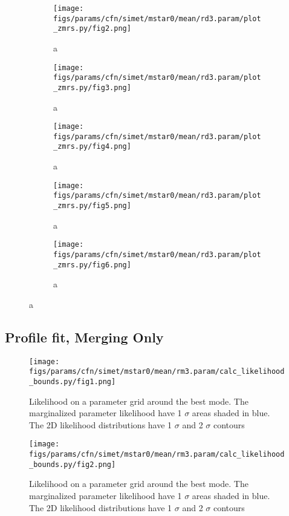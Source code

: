 \documentclass[twocolumn]{article}
\begin{document}
\begin{figure}
  \begin{subfigure}{.5\textwidth}
    \centering\texttt{[image: figs/params/cfn/simet/mstar0/mean/rd3.param/plot\_zmrs.py/fig2.png]}
    \caption{a}
  \end{subfigure}
  \begin{subfigure}{.5\textwidth}
    \centering\texttt{[image: figs/params/cfn/simet/mstar0/mean/rd3.param/plot\_zmrs.py/fig3.png]}
    \caption{a}
  \end{subfigure}
  \begin{subfigure}{.5\textwidth}
    \centering\texttt{[image: figs/params/cfn/simet/mstar0/mean/rd3.param/plot\_zmrs.py/fig4.png]}
    \caption{a}
  \end{subfigure}%
  \begin{subfigure}{.5\textwidth}
    \centering\texttt{[image: figs/params/cfn/simet/mstar0/mean/rd3.param/plot\_zmrs.py/fig5.png]}
    \caption{a}
  \end{subfigure}
  \begin{subfigure}{.5\textwidth}
    \centering\texttt{[image: figs/params/cfn/simet/mstar0/mean/rd3.param/plot\_zmrs.py/fig6.png]}
    \caption{a}
  \end{subfigure}
  
\end{figure}
\clearpage


\subsection{Profile fit, Merging Only}
\begin{figure}[H]
  \center\texttt{[image: figs/params/cfn/simet/mstar0/mean/rm3.param/calc\_likelihood\_bounds.py/fig1.png]}
  \caption{Likelihood on a parameter grid around the best mode. The marginalized parameter likelihood have
    1 $\sigma$ areas shaded in blue. The 2D likelihood distributions have 1 $\sigma$  and 2 $\sigma$ contours}
  \label{fig:basic_rd:likelihood}
\end{figure}

\begin{figure}[H]
  \center\texttt{[image: figs/params/cfn/simet/mstar0/mean/rm3.param/calc\_likelihood\_bounds.py/fig2.png]}
  \caption{Likelihood on a parameter grid around the best mode. The marginalized parameter likelihood have
    1 $\sigma$ areas shaded in blue. The 2D likelihood distributions have 1 $\sigma$  and 2 $\sigma$ contours}
  \label{fig:basic_rd:likelihood}
\end{figure}
\end{document}
